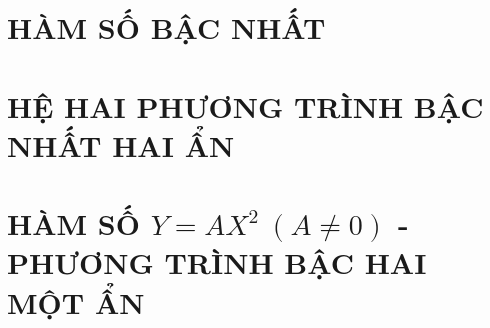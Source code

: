 \documentclass[12pt,a4paper,oneside]{book}
\theoremstyle{nonumberplain}
\begin{document}
	\tableofcontents
	\chapter{HÀM SỐ BẬC NHẤT}
	
	
	
	
	
	
	\chapter{HỆ HAI PHƯƠNG TRÌNH BẬC NHẤT HAI ẨN}
	
	
	
	
	
	\chapter{HÀM SỐ $Y = AX^2~(A \ne 0)$ - PHƯƠNG TRÌNH BẬC HAI MỘT ẨN}
	
	
	
	
	
	
		
\end{document}
